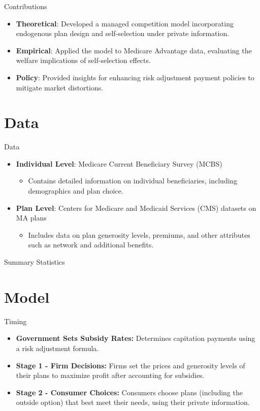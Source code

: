\documentclass[professionalfonts, aspectratio=169]{beamer}
\begin{document}
\begin{frame}{Contributions}
  \begin{itemize}
    \item \textbf{Theoretical}: Developed a managed competition model incorporating endogenous plan design and self-selection under private information.
    \item \textbf{Empirical}: Applied the model to Medicare Advantage data, evaluating the welfare implications of self-selection effects.
    \item \textbf{Policy}: Provided insights for enhancing risk adjustment payment policies to mitigate market distortions.
  \end{itemize}
\end{frame}

\section{Data}

\begin{frame}{Data}
  \begin{itemize}
    \item \textbf{Individual Level}: Medicare Current Beneficiary Survey (MCBS)
    \begin{itemize}
      \item Contains detailed information on individual beneficiaries, including demographics and plan choice.
    \end{itemize}
    \item \textbf{Plan Level}: Centers for Medicare and Medicaid Services (CMS) datasets on MA plans
    \begin{itemize}
      \item Includes data on plan generosity levels, premiums, and other attributes such as network and additional benefits.
    \end{itemize}
  \end{itemize}
\end{frame}

\begin{frame}{Summary Statistics}
  
\end{frame}
  


\section{Model}
\begin{frame}{Timing}
  \begin{itemize}
    \item \textbf{Government Sets Subsidy Rates:} Determines capitation payments using a risk adjustment formula.
    \item \textbf{Stage 1 - Firm Decisions:} Firms set the prices and generosity levels of their plans to maximize profit after accounting for subsidies.
    \item \textbf{Stage 2 - Consumer Choices:} Consumers choose plans (including the outside option) that best meet their needs, using their private information.
  \end{itemize}
\end{frame}
\end{document}
